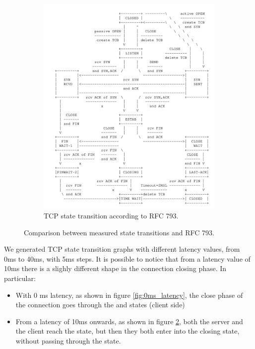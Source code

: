 \documentclass[a4paper,10pt]{article}
\begin{document}
\begin{figure}[]
\begin{subfigure}{.25\textwidth}
   \includegraphics[width=\textwidth]{images/RFC_Graph.png}
    \caption{TCP state transition according to RFC 793.}
    \label{fig:40ms_latency}
\end{subfigure}
\caption[short]{Comparison between measured state transitions and RFC 793.}
\end{figure}

We generated TCP state transition graphs with different latency values, from 0ms to 40ms, with 5ms steps. It is possible to notice that from a latency value of 10ms there is a slighly different shape in the connection closing phase. In particular:
\begin{itemize}
   \item With 0 ms latency, as shown in figure \ref{fig:0ms_latency}, the close phase of the connection goes through the  and  states (client side)
   \item From a latency of 10ms onwards, as shown in figure \ref{fig:40ms_latency}, both the server and the client reach the  state, but then they both enter into the closing state, without passing through the  state.
\end{itemize}
\end{document}
